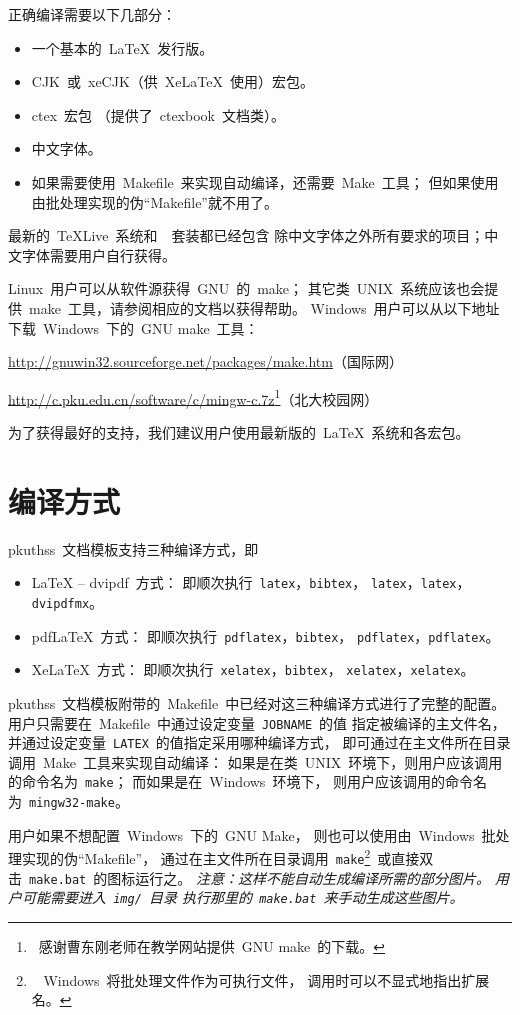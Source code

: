 	正确编译需要以下几部分：
	\begin{itemize}\denselist
		\item 一个基本的~\LaTeX{}~发行版。
		\item CJK~或~xeCJK（供~Xe\LaTeX{}~使用）宏包。
		\item ctex~宏包\supercite{ctex-doc,ctexfaq}%
			（提供了~ctexbook~文档类）。
		\item 中文字体。
		\item 如果需要使用~Makefile~来实现自动编译，还需要~Make~工具；
			但如果使用由批处理实现的伪“Makefile”就不用了。
	\end{itemize}

	最新的~\TeX{}Live~系统和~\CTeX~套装都已经包含%
	除中文字体之外所有要求的项目；中文字体需要用户自行获得。

	Linux~用户可以从软件源获得~GNU~的~make；
	其它类~UNIX~系统应该也会提供~make~工具，请参阅相应的文档以获得帮助。
	Windows~用户可以从以下地址下载~Windows~下的~GNU make~工具：

	\url{http://gnuwin32.sourceforge.net/packages/make.htm}（国际网）
	\vspace{-0.1em}\par
	\url{http://c.pku.edu.cn/software/c/mingw-c.7z}\footnote%
	{\ 感谢曹东刚老师在教学网站提供~GNU make~的下载。}（北大校园网）

	为了获得最好的支持，我们建议用户使用最新版的~\LaTeX{}~系统和各宏包。

	\section{编译方式}

	pkuthss~文档模板支持三种编译方式，即
	\begin{itemize}\denselist
	  \item \LaTeX{} -- dvipdf~方式：
		即顺次执行~\verb|latex|，\verb|bibtex|，%
		\verb|latex|，\verb|latex|，\verb|dvipdfmx|。
	  \item pdf\LaTeX{}~方式：
		即顺次执行~\verb|pdflatex|，\verb|bibtex|，%
		\verb|pdflatex|，\verb|pdflatex|。
	  \item Xe\LaTeX{}~方式：
		即顺次执行~\verb|xelatex|，\verb|bibtex|，%
		\verb|xelatex|，\verb|xelatex|。
	\end{itemize}

	pkuthss~文档模板附带的~Makefile~中已经对这三种编译方式进行了完整的配置。
	用户只需要在~Makefile~中通过设定变量~\verb|JOBNAME|~的值%
	指定被编译的主文件名，
	并通过设定变量~\verb|LATEX|~的值指定采用哪种编译方式，
	即可通过在主文件所在目录调用~Make~工具来实现自动编译：
	如果是在类~UNIX~环境下，则用户应该调用的命令名为~\verb|make|；
	而如果是在~Windows~环境下，
	则用户应该调用的命令名为~\verb|mingw32-make|。

	用户如果不想配置~Windows~下的~GNU Make，
	则也可以使用由~Windows~批处理实现的伪“Makefile”，
	通过在主文件所在目录调用~\verb|make|\footnote%
	{\ %
		Windows~将批处理文件作为可执行文件，
		调用时可以不显式地指出扩展名。
	}~或直接双击~\verb|make.bat|~的图标运行之。%
	\emph
	{%
		注意：这样不能自动生成编译所需的部分图片。
		用户可能需要进入~\texttt{img/}~目录%
		执行那里的~\texttt{make.bat}~来手动生成这些图片。
	}

